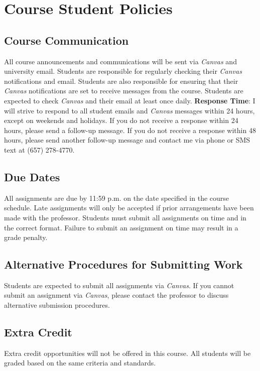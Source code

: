 \documentclass[12pt, letterpaper]{article}
\begin{document}
\section{Course Student Policies}

\subsection*{Course Communication}
All course announcements and communications will be sent via \emph{Canvas} and university email. Students are responsible for regularly checking their \emph{Canvas} notifications and email. Students are also responsible for ensuring that their \emph{Canvas} notifications are set to receive messages from the course. Students are expected to check \emph{Canvas} and their email at least once daily.
\vspace{1ex}
\noindent \textbf{Response Time}: I will strive to respond to all student emails and \emph{Canvas} messages within 24 hours, except on weekends and holidays. If you do not receive a response within 24 hours, please send a follow-up message. If you do not receive a response within 48 hours, please send another follow-up message and contact me via phone or SMS text at (657) 278-4770.

\subsection*{Due Dates}
All assignments are due by 11:59 p.m. on the date specified in the course schedule. Late assignments will only be accepted if prior arrangements have been made with the professor. Students must submit all assignments on time and in the correct format. Failure to submit an assignment on time may result in a grade penalty.

\subsection*{Alternative Procedures for Submitting Work}
Students are expected to submit all assignments via \emph{Canvas}. If you cannot submit an assignment via \emph{Canvas}, please contact the professor to discuss alternative submission procedures.

\subsection*{Extra Credit}
Extra credit opportunities will not be offered in this course. All students will be graded based on the same criteria and standards.
\end{document}
